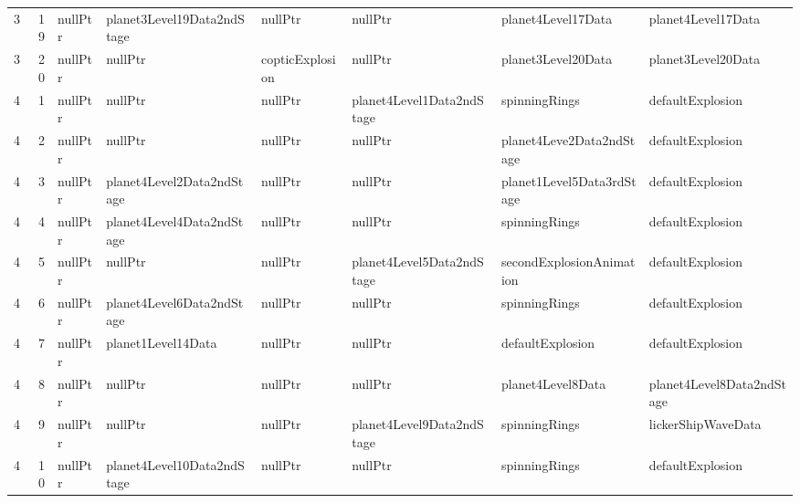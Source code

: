 \begin{tabular}{rrllllll}
      3 &      19 & nullPtr                  & planet3Level19Data2ndStage   & nullPtr                      & nullPtr                   & planet4Level17Data         & planet4Level17Data         \\
      3 &      20 & nullPtr                  & nullPtr                      & copticExplosion              & nullPtr                   & planet3Level20Data         & planet3Level20Data         \\
      4 &       1 & nullPtr                  & nullPtr                      & nullPtr                      & planet4Level1Data2ndStage & spinningRings              & defaultExplosion           \\
      4 &       2 & nullPtr                  & nullPtr                      & nullPtr                      & nullPtr                   & planet4Leve2Data2ndStage   & defaultExplosion           \\
      4 &       3 & nullPtr                  & planet4Level2Data2ndStage    & nullPtr                      & nullPtr                   & planet1Level5Data3rdStage  & defaultExplosion           \\
      4 &       4 & nullPtr                  & planet4Level4Data2ndStage    & nullPtr                      & nullPtr                   & spinningRings              & defaultExplosion           \\
      4 &       5 & nullPtr                  & nullPtr                      & nullPtr                      & planet4Level5Data2ndStage & secondExplosionAnimation   & defaultExplosion           \\
      4 &       6 & nullPtr                  & planet4Level6Data2ndStage    & nullPtr                      & nullPtr                   & spinningRings              & defaultExplosion           \\
      4 &       7 & nullPtr                  & planet1Level14Data           & nullPtr                      & nullPtr                   & defaultExplosion           & defaultExplosion           \\
      4 &       8 & nullPtr                  & nullPtr                      & nullPtr                      & nullPtr                   & planet4Level8Data          & planet4Level8Data2ndStage  \\
      4 &       9 & nullPtr                  & nullPtr                      & nullPtr                      & planet4Level9Data2ndStage & spinningRings              & lickerShipWaveData         \\
      4 &      10 & nullPtr                  & planet4Level10Data2ndStage   & nullPtr                      & nullPtr                   & spinningRings              & defaultExplosion           \\

\end{tabular}

